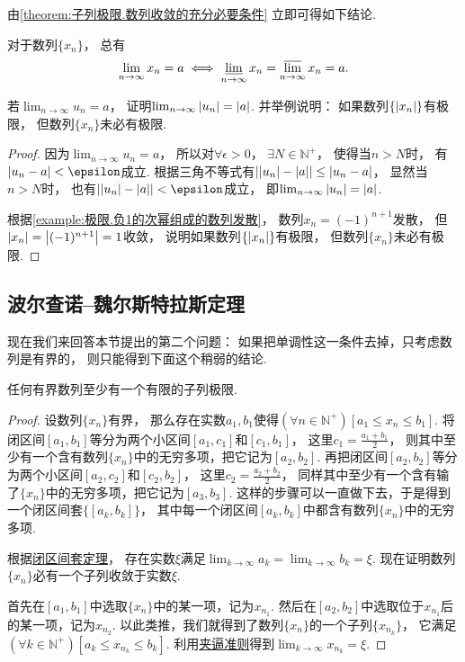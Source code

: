 由\cref{theorem:子列极限.数列收敛的充分必要条件} 立即可得如下结论.
\begin{corollary}
对于数列\(\{x_n\}\)，
总有\[
	\lim_{n\to\infty} x_n = a
	\iff
	\varliminf_{n\to\infty} x_n
	= \varlimsup_{n\to\infty} x_n
	= a.
\]
\end{corollary}

\begin{example}
若\(\lim_{n\to\infty} u_n = a\)，
证明\(\lim_{n\to\infty} \abs{u_n} = \abs{a}\).
并举例说明：
如果数列\(\{\abs{x_n}\}\)有极限，
但数列\(\{x_n\}\)未必有极限.
\begin{proof}
因为\(\lim_{n\to\infty} u_n = a\)，
所以对\(\forall\epsilon>0\)，
\(\exists N \in \mathbb{N}^+\)，
使得当\(n>N\)时，
有\(\abs{u_n-a}<\epsilon\)成立.
根据三角不等式有\(\abs{\abs{u_n}-\abs{a}} \leq \abs{u_n-a}\)，
显然当\(n>N\)时，
也有\(\abs{\abs{u_n}-\abs{a}}<\epsilon\)成立，
即\(\lim_{n\to\infty} \abs{u_n} = \abs{a}\).

根据\cref{example:极限.负1的次幂组成的数列发散}，
数列\(x_n = (-1)^{n+1}\)发散，
但\(\abs{x_n} = \abs{(-1)^{n+1}} = 1\)收敛，
说明如果数列\(\{\abs{x_n}\}\)有极限，
但数列\(\{x_n\}\)未必有极限.
\end{proof}
\end{example}

\subsection{波尔查诺--魏尔斯特拉斯定理}
现在我们来回答本节提出的第二个问题：
如果把单调性这一条件去掉，只考虑数列是有界的，
则只能得到下面这个稍弱的结论.
\begin{theorem}\label{theorem:极限.波尔查诺--魏尔斯特拉斯定理}
任何有界数列至少有一个有限的子列极限.
\begin{proof}
设数列\(\{x_n\}\)有界，
那么存在实数\(a_1,b_1\)使得\((\forall n\in\mathbb{N}^+)[a_1 \leq x_n \leq b_1]\).
将闭区间\([a_1,b_1]\)等分为两个小区间\([a_1,c_1]\)和\([c_1,b_1]\)，
这里\(c_1=\frac{a_1+b_1}2\)，
则其中至少有一个含有数列\(\{x_n\}\)中的无穷多项，把它记为\([a_2,b_2]\).
再把闭区间\([a_2,b_2]\)等分为两个小区间\([a_2,c_2]\)和\([c_2,b_2]\)，
这里\(c_2=\frac{a_2+b_2}2\)，
同样其中至少有一个含有输了\(\{x_n\}\)中的无穷多项，把它记为\([a_3,b_3]\).
这样的步骤可以一直做下去，于是得到一个闭区间套\(\{[a_k,b_k]\}\)，
其中每一个闭区间\([a_k,b_k]\)中都含有数列\(\{x_n\}\)中的无穷多项.

根据\hyperref[definition:极限.闭区间套定理]{闭区间套定理}，
存在实数\(\xi\)满足\(\lim_{k\to\infty} a_k = \lim_{k\to\infty} b_k = \xi\).
现在证明数列\(\{x_n\}\)必有一个子列收敛于实数\(\xi\).

首先在\([a_1,b_1]\)中选取\(\{x_n\}\)中的某一项，记为\(x_{n_1}\).
然后在\([a_2,b_2]\)中选取位于\(x_{n_1}\)后的某一项，记为\(x_{n_2}\).
以此类推，我们就得到了数列\(\{x_n\}\)的一个子列\(\{x_{n_k}\}\)，
它满足\((\forall k\in\mathbb{N}^+)[a_k \leq x_{n_k} \leq b_k]\).
利用\hyperref[theorem:极限.夹逼准则]{夹逼准则}得到\(\lim_{k\to\infty} x_{n_k} = \xi\).
\end{proof}
\end{theorem}

